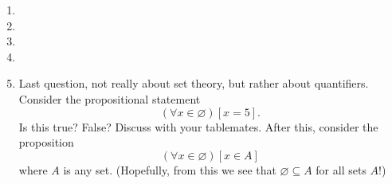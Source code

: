 

 \begin{enumerate}
   \item 
   \item 
   \item 
   \item 
   \item Last question, not really about set theory, but rather about quantifiers. Consider the propositional statement
   \[(\forall x \in \varnothing)[x = 5].\]
   Is this true? False? Discuss with your tablemates. After this, consider the proposition
   \[(\forall x \in \varnothing)[x \in A]\] where $A$ is any set. (Hopefully, from this we see that $\varnothing \subseteq A$ for all sets $A$!)
 \end{enumerate}